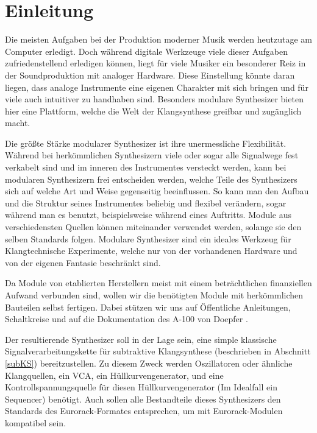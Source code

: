 \chapter{Einleitung}

Die meisten Aufgaben bei der Produktion moderner Musik werden heutzutage am Computer erledigt. Doch während digitale Werkzeuge viele dieser Aufgaben zufriedenstellend erledigen können, liegt für viele Musiker ein besonderer Reiz in der Soundproduktion mit analoger Hardware. Diese Einstellung könnte daran liegen, dass analoge Instrumente eine eigenen Charakter mit sich bringen und für viele auch intuitiver zu handhaben sind. Besonders modulare Synthesizer bieten hier eine Plattform, welche die Welt der Klangsynthese greifbar und zugänglich macht.

Die größte Stärke modularer Synthesizer ist ihre unermessliche Flexibilität. Während bei herkömmlichen Synthesizern viele oder sogar alle Signalwege fest verkabelt sind und im inneren des Instrumentes versteckt werden, kann bei modularen Synthesizern frei entscheiden werden, welche Teile des Synthesizers sich auf welche Art und Weise gegenseitig beeinflussen. So kann man den Aufbau und die Struktur seines Instrumentes beliebig und flexibel verändern, sogar während man es benutzt, beispielsweise während eines Auftritts. Module aus verschiedensten Quellen können miteinander verwendet werden, solange sie den selben Standards folgen. Modulare Synthesizer sind ein ideales Werkzeug für Klangtechnische Experimente, welche nur von der vorhandenen Hardware und von der eigenen Fantasie beschränkt sind.

Da Module von etablierten Herstellern meist mit einem beträchtlichen finanziellen Aufwand verbunden sind, wollen wir die benötigten Module mit herkömmlichen Bauteilen selbst fertigen. Dabei stützen wir uns auf Öffentliche Anleitungen, Schaltkreise und auf die Dokumentation des A-100 von Doepfer \cite{doepfer:A-100}.

\pagebreak

Der resultierende Synthesizer soll in der Lage sein, eine simple klassische Signalverarbeitungskette für subtraktive Klangsynthese (beschrieben in Abschnitt \ref{subKS}) bereitzustellen. Zu diesem Zweck werden Oszillatoren oder ähnliche Klangquellen, ein \ac{VCA}, ein Hüllkurvengenerator, und eine Kontrollspannungsquelle für diesen Hüllkurvengenerator (Im Idealfall ein Sequencer) benötigt. Auch sollen alle Bestandteile dieses Synthesizers den Standards des Eurorack-Formates entsprechen, um mit Eurorack-Modulen kompatibel sein.

